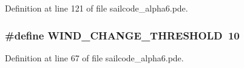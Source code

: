 \-Definition at line 121 of file sailcode\-\_\-alpha6.\-pde.

\hypertarget{group__globalconstants_ga0e751f6a929915f9b2ea482bc096d3ca}{
\subsubsection[{\-W\-I\-N\-D\-\_\-\-C\-H\-A\-N\-G\-E\-\_\-\-T\-H\-R\-E\-S\-H\-O\-L\-D}]{\setlength{\rightskip}{0pt plus 5cm}\#define \-W\-I\-N\-D\-\_\-\-C\-H\-A\-N\-G\-E\-\_\-\-T\-H\-R\-E\-S\-H\-O\-L\-D~10}}
\label{group__globalconstants_ga0e751f6a929915f9b2ea482bc096d3ca}


\-Definition at line 67 of file sailcode\-\_\-alpha6.\-pde.

